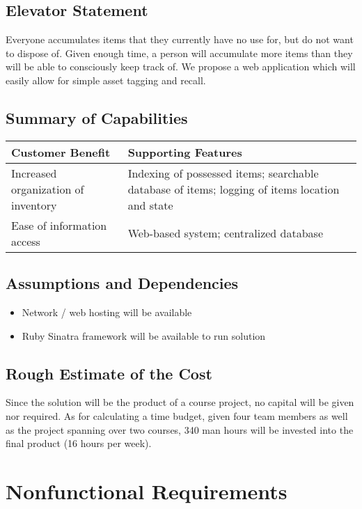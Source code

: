 \documentclass{article}
\begin{document}
\subsection{Elevator Statement}
Everyone accumulates items that they currently have no use for, but do not want to dispose of.  Given enough time, a person will accumulate more items than they will be able to consciously keep track of. We propose a web application which will easily allow for simple asset tagging and recall.

\subsection{Summary of Capabilities}
\begin{tabular}{ | p{2.5in} | p{3.5in} | }
\hline
\textbf{Customer Benefit} & \textbf{Supporting Features}\\
\hline
\hline
Increased organization of inventory & Indexing of possessed items; searchable database of items; logging of items location and state\\
\hline
Ease of information access & Web-based system; centralized database\\
\hline
\end{tabular}

\subsection{Assumptions and Dependencies}
\begin{itemize}
\item Network / web hosting will be available
\item Ruby Sinatra framework will be available to run solution
\end{itemize}

\subsection{Rough Estimate of the Cost}
Since the solution will be the product of a course project, no capital will be given nor required.  As for calculating a time budget, given four team members as well as the project spanning over two courses, 340 man hours will be invested into the final product (16 hours per week).

\section{Nonfunctional Requirements}
\end{document}

